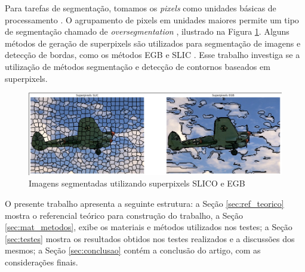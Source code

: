 \begin{document}
Para tarefas de segmentação, tomamos os \textit{pixels} como unidades básicas de processamento \cite{WANG201728}. O agrupamento de pixels em unidades maiores permite um tipo de segmentação chamado de \textit{oversegmentation} \cite{WANG201728}, ilustrado na Figura \ref{fig:superpixel}. Alguns métodos de geração de superpixels são utilizados para segmentação de imagens e detecção de bordas, como os métodos EGB \cite{FELZENSZWALB} e SLIC \cite{SLIC}. Esse trabalho investiga se a utilização de métodos segmentação e detecção de contornos baseados em superpixels.


\begin{figure}[ht]
\centering
\includegraphics[width=1.\textwidth]{superpixels.png}
\caption{Imagens segmentadas utilizando superpixels SLICO e EGB}
\label{fig:superpixel}
\end{figure}

O presente trabalho apresenta a seguinte estrutura: a Seção \ref{sec:ref_teorico} mostra o referencial teórico para construção do trabalho, a Seção  \ref{sec:mat_metodos}, exibe os materiais e métodos utilizados nos testes; a Seção \ref{sec:testes} mostra os resultados obtidos nos testes realizados e a discussões dos mesmos; a Seção \ref{sec:conclusao} contém a conclusão do artigo, com as considerações finais.

\end{document}
